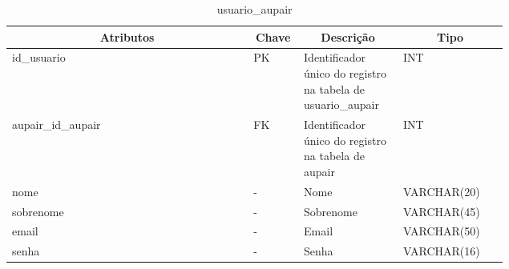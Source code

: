 \begin{enumerate}
    \begin{table}[H]
    \caption{usuario\_aupair}
    \label{idioma}
    	\centering\footnotesize
        \begin{tabular}{|p{0.40\linewidth} | p{0.04\linewidth} |  p{0.12\linewidth} | p{0.16\linewidth} |}  \hline
        \multicolumn{1}{|c|}{\textbf{Atributos}} &
        \multicolumn{1}{|c|}{\textbf{Chave}} &
        \multicolumn{1}{c|}{\textbf{Descrição}} &
        \multicolumn{1}{c|}{\textbf{Tipo}} \\ \hline
          
        id\_usuario &  
        PK & 
        Identificador único do registro na tabela de usuario\_aupair &
        INT
        \\  \hline
        
        aupair\_id\_aupair  &  
        FK & 
        Identificador único do registro na tabela de aupair &
        INT
        \\  \hline
        
        nome  &  
        - & 
        Nome &
        VARCHAR(20)
        \\  \hline
        
        sobrenome  &  
        - & 
        Sobrenome &
        VARCHAR(45)
        \\  \hline
        
        email  &  
        - & 
        Email &
        VARCHAR(50)
        \\  \hline
        
        senha  &  
        - & 
        Senha &
        VARCHAR(16)
        \\  \hline
       
        \end{tabular}
    \end{table}
\end{enumerate}

